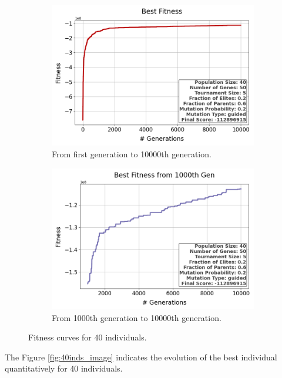 \documentclass{assignment}
\begin{document}
\begin{figure}[h!]
    \begin{subfigure}{0.5\textwidth}
        \includegraphics[width=\textwidth]{figures/best_fitness_output_40_50_5_0.2_0.6_0.2_guided.png}
        \caption{From first generation to 10000th generation.}
    \end{subfigure}\hfill
    \begin{subfigure}{0.5\textwidth}
        \includegraphics[width=\textwidth]{figures/best_fitness_1000_output_40_50_5_0.2_0.6_0.2_guided.png}
        \caption{From 1000th generation to 10000th generation.}
    \end{subfigure}
    \caption{Fitness curves for 40 individuals.}
\label{fig:40inds}
\end{figure}

The Figure \ref{fig:40inds_image} indicates the evolution of the best individual quantitatively for 40 individuals.
\end{document}

